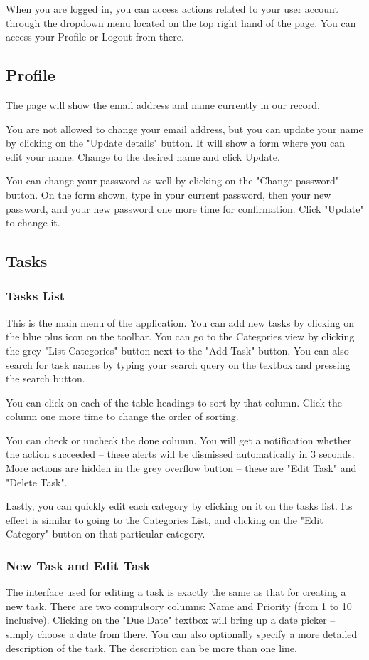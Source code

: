\documentclass[12pt, a4paper]{article}
\begin{document}
		When you are logged in, you can access actions related to your user account through the dropdown menu located on the top right hand of the page. You can access your Profile or Logout from there.
		
		\subsection{Profile}
		The page will show the email address and name currently in our record.
		
		You are not allowed to change your email address, but you can update your name by clicking on the "Update details" button. It will show a form where you can edit your name. Change to the desired name and click Update.
		
		You can change your password as well by clicking on the "Change password" button. On the form shown, type in your current password, then your new password, and your new password one more time for confirmation. Click "Update" to change it.
		
		\subsection{Tasks}
		\subsubsection{Tasks List}
		This is the main menu of the application. You can add new tasks by clicking on the blue plus icon on the toolbar. You can go to the Categories view by clicking the grey "List Categories" button next to the "Add Task" button. You can also search for task names by typing your search query on the textbox and pressing the search button.
		
		You can click on each of the table headings to sort by that column. Click the column one more time to change the order of sorting.
		
		You can check or uncheck the done column. You will get a notification whether the action succeeded -- these alerts will be dismissed automatically in 3 seconds. More actions are hidden in the grey overflow button -- these are "Edit Task" and "Delete Task".
		
		Lastly, you can quickly edit each category by clicking on it on the tasks list. Its effect is similar to going to the Categories List, and clicking on the "Edit Category" button on that particular category.
		
		\subsubsection{New Task and Edit Task}
		The interface used for editing a task is exactly the same as that for creating a new task. There are two compulsory columns: Name and Priority (from 1 to 10 inclusive). Clicking on the "Due Date" textbox will bring up a date picker -- simply choose a date from there. You can also optionally specify a more detailed description of the task. The description can be more than one line.
		
\end{document}
